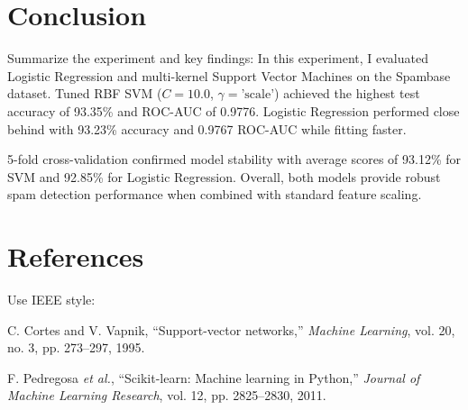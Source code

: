 \documentclass[12pt,a4paper]{article}
\begin{document}
\section{Conclusion}
Summarize the experiment and key findings:
In this experiment, I evaluated Logistic Regression and multi-kernel Support Vector Machines on the Spambase dataset. Tuned RBF SVM ($C=10.0$, $\gamma=\text{'scale'}$) achieved the highest test accuracy of 93.35\% and ROC-AUC of 0.9776. Logistic Regression performed close behind with 93.23\% accuracy and 0.9767 ROC-AUC while fitting faster. 

5-fold cross-validation confirmed model stability with average scores of 93.12\% for SVM and 92.85\% for Logistic Regression. Overall, both models provide robust spam detection performance when combined with standard feature scaling.

\section{References}
Use IEEE style:
\begin{enumerate}[label={[\arabic*]}]
\item C. Cortes and V. Vapnik, ``Support-vector networks,'' \textit{Machine Learning}, vol. 20, no. 3, pp. 273--297, 1995.
\item F. Pedregosa \textit{et al.}, ``Scikit-learn: Machine learning in Python,'' \textit{Journal of Machine Learning Research}, vol. 12, pp. 2825--2830, 2011.
\end{enumerate}
\end{document}
